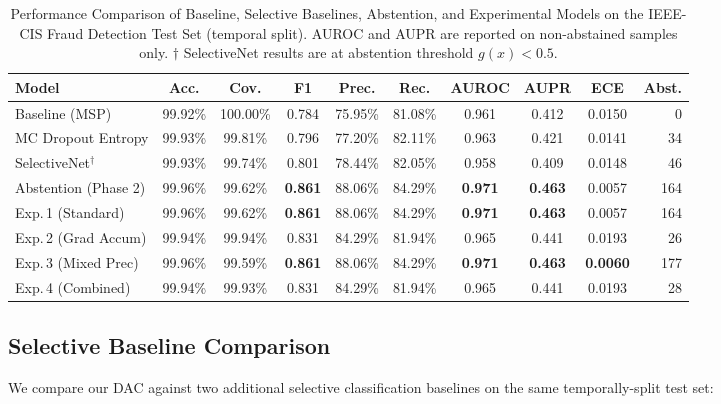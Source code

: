 \documentclass[12pt,a4paper]{article}
\begin{document}
\begin{table}[t]
  \centering
  \caption{Performance Comparison of Baseline, Selective Baselines, Abstention,
    and Experimental Models on the IEEE-CIS Fraud Detection Test Set (temporal
    split). AUROC and AUPR are reported on non-abstained samples only.
    $\dagger$ SelectiveNet results are at abstention threshold $g(x)<0.5$.}
  \label{tab:results}
  \begin{tabular}{lccccccccr}
    \toprule
    \textbf{Model} & \textbf{Acc.} & \textbf{Cov.} &
    \textbf{F1} & \textbf{Prec.} & \textbf{Rec.} &
    \textbf{AUROC} & \textbf{AUPR} & \textbf{ECE} & \textbf{Abst.} \\
    \midrule
    Baseline (MSP)           & 99.92\% & 100.00\% & 0.784 & 75.95\% & 81.08\% & 0.961 & 0.412 & 0.0150 &   0 \\
    MC Dropout Entropy       & 99.93\% &  99.81\% & 0.796 & 77.20\% & 82.11\% & 0.963 & 0.421 & 0.0141 &  34 \\
    SelectiveNet$^{\dagger}$ & 99.93\% &  99.74\% & 0.801 & 78.44\% & 82.05\% & 0.958 & 0.409 & 0.0148 &  46 \\
    \midrule
    Abstention (Phase 2)     & 99.96\% &  99.62\% & \textbf{0.861} & 88.06\% & 84.29\% & \textbf{0.971} & \textbf{0.463} & 0.0057 & 164 \\
    Exp.\,1 (Standard)       & 99.96\% &  99.62\% & \textbf{0.861} & 88.06\% & 84.29\% & \textbf{0.971} & \textbf{0.463} & 0.0057 & 164 \\
    Exp.\,2 (Grad Accum)     & 99.94\% &  99.94\% & 0.831 & 84.29\% & 81.94\% & 0.965 & 0.441 & 0.0193 &  26 \\
    Exp.\,3 (Mixed Prec)     & 99.96\% &  99.59\% & \textbf{0.861} & 88.06\% & 84.29\% & \textbf{0.971} & \textbf{0.463} & \textbf{0.0060} & 177 \\
    Exp.\,4 (Combined)       & 99.94\% &  99.93\% & 0.831 & 84.29\% & 81.94\% & 0.965 & 0.441 & 0.0193 &  28 \\
    \bottomrule
  \end{tabular}
\end{table}

\subsection{Selective Baseline Comparison}

We compare our DAC against two additional selective classification baselines
on the same temporally-split test set:
\end{document}
